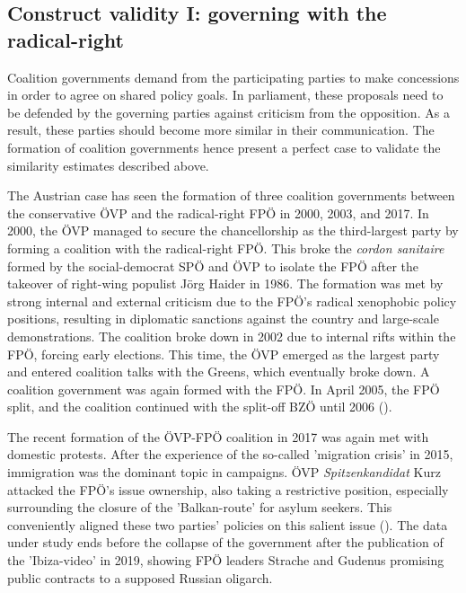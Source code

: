 \documentclass{article}
\begin{document}
\subsection{Construct validity I: governing with the radical-right}
Coalition governments demand from the participating parties to make concessions in order to agree on shared policy goals. In parliament, these proposals need to be defended by the governing parties against criticism from the opposition. As a result, these parties should become more similar in their communication. The formation of coalition governments hence present a perfect case to validate the similarity estimates described above. \par

The Austrian case has seen the formation of three coalition governments between the conservative ÖVP and the radical-right FPÖ in 2000, 2003, and 2017. In 2000, the ÖVP managed to secure the chancellorship as the third-largest party by forming a coalition with the radical-right FPÖ. This broke the \textit{cordon sanitaire} formed by the social-democrat SPÖ and ÖVP to isolate the FPÖ after the takeover of right-wing populist Jörg Haider in 1986. The formation was met by strong internal and external criticism due to the FPÖ's radical xenophobic policy positions, resulting in diplomatic sanctions against the country and large-scale demonstrations. The coalition broke down in 2002 due to internal rifts within the FPÖ, forcing early elections. This time, the ÖVP emerged as the largest party and entered coalition talks with the Greens, which eventually broke down. A coalition government was again formed with the FPÖ. In April 2005, the FPÖ split, and the coalition continued with the split-off BZÖ until 2006 (\cite{Luther2010}).\par

The recent formation of the ÖVP-FPÖ coalition in 2017 was again met with domestic protests. After the experience of the so-called 'migration crisis' in 2015, immigration was the dominant topic in campaigns. ÖVP \textit{Spitzenkandidat} Kurz attacked the FPÖ's issue ownership, also taking  a restrictive position, especially surrounding the closure of the 'Balkan-route' for asylum seekers. This conveniently aligned these two parties' policies on this salient issue (\cite{Bodlos2018}). The data under study ends before the collapse of the government after the publication of the 'Ibiza-video' in 2019, showing FPÖ leaders Strache and Gudenus promising public contracts to a supposed Russian oligarch.\par 
\end{document}
